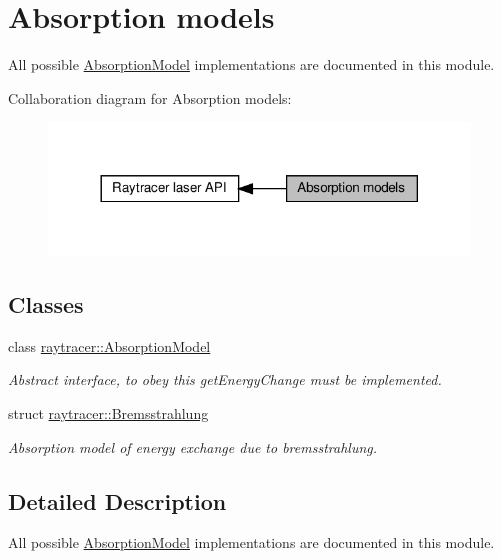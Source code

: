 \hypertarget{group__absorption}{}\section{Absorption models}
\label{group__absorption}


All possible \hyperlink{classraytracer_1_1AbsorptionModel}{Absorption\+Model} implementations are documented in this module.  


Collaboration diagram for Absorption models\+:
\nopagebreak
\begin{figure}[H]
\begin{center}
\leavevmode
\includegraphics[width=317pt]{group__absorption}
\end{center}
\end{figure}
\subsection*{Classes}
\begin{DoxyCompactItemize}
\item 
class \hyperlink{classraytracer_1_1AbsorptionModel}{raytracer\+::\+Absorption\+Model}
\begin{DoxyCompactList}\small\item\em Abstract interface, to obey this get\+Energy\+Change must be implemented. \end{DoxyCompactList}\item 
struct \hyperlink{structraytracer_1_1Bremsstrahlung}{raytracer\+::\+Bremsstrahlung}
\begin{DoxyCompactList}\small\item\em Absorption model of energy exchange due to bremsstrahlung. \end{DoxyCompactList}\end{DoxyCompactItemize}


\subsection{Detailed Description}
All possible \hyperlink{classraytracer_1_1AbsorptionModel}{Absorption\+Model} implementations are documented in this module. 

